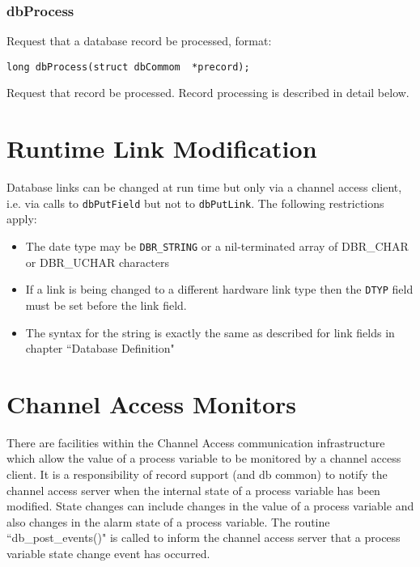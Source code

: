 \subsubsection{dbProcess }

Request that a database record be processed, format:

\begin{verbatim}long dbProcess(struct dbCommom  *precord);
\end{verbatim}Request that record be processed. Record processing is described in detail below.

\section{Runtime Link Modification}

Database links can be changed at run time but only via a channel access client, i.e. via calls to \verb|dbPutField| but not to 
\verb|dbPutLink|. The following restrictions apply:

\begin{itemize}\item The date type may be \verb|DBR_STRING| or a nil-terminated array of DBR\_CHAR or DBR\_UCHAR characters

\item If a link is being changed to a different hardware link type then the \verb|DTYP| field must be set before the link field.

\item The syntax for the string is exactly the same as described for link fields in chapter ``Database Definition"

\end{itemize}\section{Channel Access Monitors}

There are facilities within the Channel Access communication infrastructure which allow the value of a process variable 
to be monitored by a channel access client. It is a responsibility of record support (and db common) to notify the channel 
access server when the internal state of a process variable has been modified. State changes can include changes in the 
value of a process variable and also changes in the alarm state of a process variable. The routine ``db\_post\_events()" is 
called to inform the channel access server that a process variable state change event has occurred.


